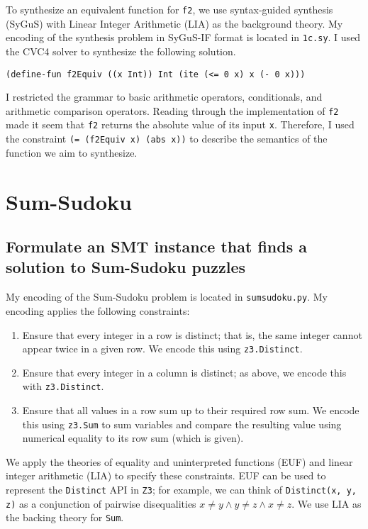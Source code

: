 \documentclass{article}
\newcommand{\code}[1]{\texttt{#1}}
\begin{document}
\noindent To synthesize an equivalent function for \code{f2}, we use syntax-guided synthesis (SyGuS) with Linear Integer Arithmetic (LIA) as the background theory. My encoding of the synthesis problem in SyGuS-IF format is located in \code{1c.sy}. I used the CVC4 solver to synthesize the following solution.

\begin{lstlisting}
(define-fun f2Equiv ((x Int)) Int (ite (<= 0 x) x (- 0 x)))
\end{lstlisting}

\medskip
\noindent I restricted the grammar to basic arithmetic operators, conditionals, and arithmetic comparison operators. Reading through the implementation of \code{f2} made it seem that \code{f2} returns the absolute value of its input \code{x}. Therefore, I used the constraint \code{(= (f2Equiv x) (abs x))} to describe the semantics of the function we aim to synthesize.

\section{Sum-Sudoku}

\subsection{Formulate an SMT instance that finds a solution to Sum-Sudoku puzzles}

\noindent My encoding of the Sum-Sudoku problem is located in \code{sumsudoku.py}. My encoding applies the following constraints:

\begin{enumerate}
  \item Ensure that every integer in a row is distinct; that is, the same integer cannot appear twice in a given row. We encode this using \code{z3.Distinct}.
  \item Ensure that every integer in a column is distinct; as above, we encode this with \code{z3.Distinct}.
  \item Ensure that all values in a row sum up to their required row sum. We encode this using \code{z3.Sum} to sum variables and compare the resulting value using numerical equality to its row sum (which is given).
\end{enumerate}

\medskip
\noindent We apply the theories of equality and uninterpreted functions (EUF) and linear integer arithmetic (LIA) to specify these constraints. EUF can be used to represent the \code{Distinct} API in \code{Z3}; for example, we can think of \code{Distinct(x, y, z)} as a conjunction of pairwise disequalities $x \neq y \land y \neq z \land x \neq z$. We use LIA as the backing theory for \code{Sum}.
\end{document}

